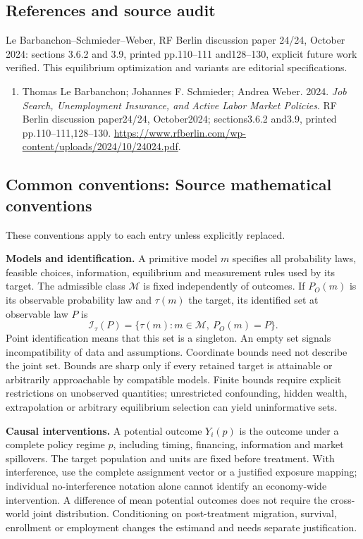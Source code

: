 \documentclass[11pt,a4paper]{article}
\begin{document}
\subsection*{References and source audit}
Le Barbanchon--Schmieder--Weber, RF Berlin discussion paper 24/24, October 2024: sections 3.6.2 and 3.9, printed pp.110--111 and128--130, explicit future work verified. This equilibrium optimization and variants are editorial specifications.
\begin{enumerate}\raggedright
\item\hypertarget{definitions:source:30007760:1}{} Thomas Le Barbanchon; Johannes F. Schmieder; Andrea Weber. 2024. \emph{Job Search, Unemployment Insurance, and Active Labor Market Policies}. RF Berlin discussion paper24/24, October2024; sections3.6.2 and3.9, printed pp.110–111,128–130.
\url{https://www.rfberlin.com/wp-content/uploads/2024/10/24024.pdf}.
\end{enumerate}

\subsection*{Common conventions: Source mathematical conventions}

These conventions apply to each entry unless explicitly replaced.

\textbf{Models and identification.} A primitive model \(m\) specifies all probability laws, feasible choices, information, equilibrium and measurement rules used by its target. The admissible class \(\mathcal M\) is fixed independently of outcomes. If \(P_O(m)\) is its observable probability law and \(\tau(m)\) the target, its identified set at observable law \(P\) is
\[
 \mathcal I_\tau(P)=\{\tau(m):m\in\mathcal M,\ P_O(m)=P\}.
\]
Point identification means that this set is a singleton. An empty set signals incompatibility of data and assumptions. Coordinate bounds need not describe the joint set. Bounds are sharp only if every retained target is attainable or arbitrarily approachable by compatible models. Finite bounds require explicit restrictions on unobserved quantities; unrestricted confounding, hidden wealth, extrapolation or arbitrary equilibrium selection can yield uninformative sets.

\textbf{Causal interventions.} A potential outcome \(Y_i(p)\) is the outcome under a complete policy regime \(p\), including timing, financing, information and market spillovers. The target population and units are fixed before treatment. With interference, use the complete assignment vector or a justified exposure mapping; individual no-interference notation alone cannot identify an economy-wide intervention. A difference of mean potential outcomes does not require the cross-world joint distribution. Conditioning on post-treatment migration, survival, enrollment or employment changes the estimand and needs separate justification.
\end{document}
